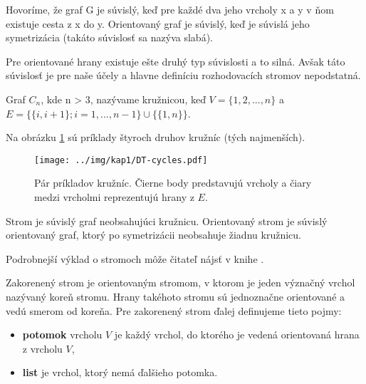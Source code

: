 \begin{def-sk}[Súvislosť]\label{kap1:2.3:2.3.1:suvislost}
Hovoríme, že graf G je súvislý, keď pre každé dva jeho vrcholy x a y v ňom existuje cesta z x do y. Orientovaný graf je súvislý, keď je súvislá jeho symetrizácia (takáto súvislosť sa nazýva slabá).
\end{def-sk}

Pre orientované hrany existuje ešte druhý typ súvislosti a to silná. Avšak táto súvislosť je pre naše účely a hlavne definíciu rozhodovacích stromov nepodstatná.

\begin{def-sk}[Kružnica]\label{kap1:2.3:2.3.1:kruznica}
Graf $C_{n}$, kde n > 3, nazývame kružnicou, keď $ V = \{1,2,...,n\}$ a $E = \{\{i,i+1\};i=1,...,n-1\} \cup \{\{1,n\}\}$.
\end{def-sk}

Na obrázku \ref{fig:decisionTreeCycles} sú príklady štyroch druhov kružníc (tých najmenších).

\begin{figure}[h]
\centering
\centerline{\mbox{\texttt{[image: ../img/kap1/DT-cycles.pdf]}}}
\caption{Pár príkladov kružníc. Čierne body predstavujú vrcholy a čiary medzi vrcholmi reprezentujú hrany z $E$.}\label{fig:decisionTreeCycles}
\end{figure}

\begin{def-sk}[Strom]\label{kap1:2.3:2.3.1:strom}
Strom je súvislý graf neobsahujúci kružnicu. Orientovaný strom je súvislý orientovaný graf, ktorý po symetrizácii neobsahuje žiadnu kružnicu.
\end{def-sk}

Podrobnejší výklad o stromoch môže čitateľ nájsť v knihe \cite{kap1-KapitolyDiskretka}. 

\begin{def-sk}\label{kap1:2.3:2.3.1:korenovystrom}
Zakorenený strom je orientovaným stromom, v ktorom je jeden význačný vrchol nazývaný koreň stromu. Hrany takéhoto stromu sú jednoznačne orientované a vedú smerom od koreňa. Pre zakorenený strom ďalej definujeme tieto pojmy:
\begin{itemize}
\item \textbf{potomok} vrcholu $V$ je každý vrchol, do ktorého je vedená orientovaná hrana z vrcholu $V$,
\item \textbf{list} je vrchol, ktorý nemá ďalšieho potomka.
\end{itemize} 
\end{def-sk}

